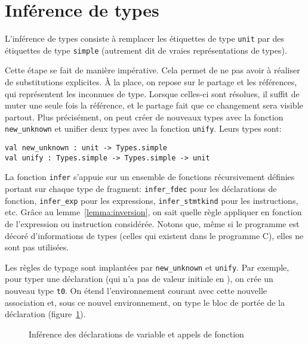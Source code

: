 \section{Inférence de types}

L'inférence de types consiste à remplacer les étiquettes de type \texttt{unit}
par des étiquettes de type \texttt{simple} (autrement dit de vraies
représentations de types).


Cette étape se fait de manière impérative. Cela permet de ne pas avoir à
réaliser de substitutions explicites. À la place, on repose sur le partage et
les références, qui représentent les inconnues de type. Lorsque celles-ci sont
résolues, il suffit de muter une seule fois la référence, et le partage fait que
ce changement sera visible partout. Plus précisément, on peut créer de nouveaux
types avec la fonction \texttt{new\_unknown} et unifier deux types avec la
fonction \texttt{unify}. Leurs types sont:

\begin{verbatim}
val new_unknown : unit -> Types.simple
val unify : Types.simple -> Types.simple -> unit
\end{verbatim}

La fonction \texttt{infer} s'appuie sur un ensemble de fonctions récursivement
définies portant sur chaque type de fragment: \texttt{infer\_fdec} pour les
déclarations de fonction, \texttt{infer\_exp} pour les expressions,
\texttt{infer\_stmtkind} pour les instructions, etc. Grâce au
lemme~\ref{lemma:inversion}, on sait quelle règle appliquer en fonction de
l'expression ou instruction considérée. Notons que, même si le programme
\newspeak est décoré d'informations de types (celles qui existent dans le
programme C), elles ne sont pas utilisées.

Les règles de typage sont implantées par \texttt{new\_unknown} et
\texttt{unify}. Par exemple, pour typer une déclaration (qui n'a pas de valeur
initiale en \newspeak), on crée un nouveau type \texttt{t0}. On étend
l'environnement courant avec cette nouvelle association et, sous ce nouvel
environnement, on type le bloc de portée de la déclaration
(figure~\ref{fig:implem-unif-stmt}).

\begin{figure}[h] %


\caption{Inférence des déclarations de variable et appels de
         fonction}

\label{fig:implem-unif-stmt}
\end{figure}%

